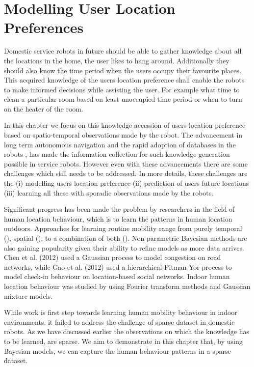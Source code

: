 \chapter{Modelling User Location Preferences }
\label{chapter:Human location}
Domestic service robots in future should be able to gather knowledge about all the locations in the home, the user likes to hang around. Additionally they should also know the time period when the users occupy their favourite places. This acquired knowledge of the users location preference shall enable the robots to make informed decisions while assisting the user. For example what time to clean a particular room based on least unoccupied time period or when to turn on the heater of the room. 

In this chapter we focus on this knowledge accession of users location preference based on spatio-temporal observations made by the robot. The advancement in long term autonomous navigation \cite{krajnik_life-long_2015} and the rapid adoption of databases in the robots \cite{niemueller2012generic}, has made the information collection for such knowledge generation possible in service robots. However even with these advancements there are some challenges which still needs to be addressed.  In more details, these challenges are the  (i) modelling users location preference  (ii) prediction of users future locations  (iii) learning all these with sporadic observations made by the robots. 

Significant progress has been made the problem by researchers in the field of human location behaviour, which is to learn the patterns in human location outdoors. Approaches for learning routine mobility  range from purely temporal  (\cite{mcinerney2013modelling, scellato2011nextplace}), spatial  (\cite{gao2012exploring,song2006evaluating}), to a combination  of  both   (\cite{eagle2009eigenbehaviors}). Non-parametric Bayesian methods are also gaining popularity given their ability to refine models as more data arrives. Chen et al.  (2012) used a Gaussian process to model congestion on road networks, while Gao et al.  (2012) used a hierarchical Pitman Yor process to model check-in behaviour on location-based social networks. Indoor human location behaviour was studied by \cite{krajnik_wheres_2015} using Fourier transform methods and Gaussian mixture models. 

While \cite{krajnik_wheres_2015}  work is first step towards learning human mobility behaviour in indoor environments, it failed to address the challenge of sparse dataset in domestic robots. As we have discussed earlier the observations on which the knowledge has to be learned, are sparse. We aim to demonstrate in this chapter that, by using Bayesian models, we can capture the human behaviour patterns in a sparse dataset.

